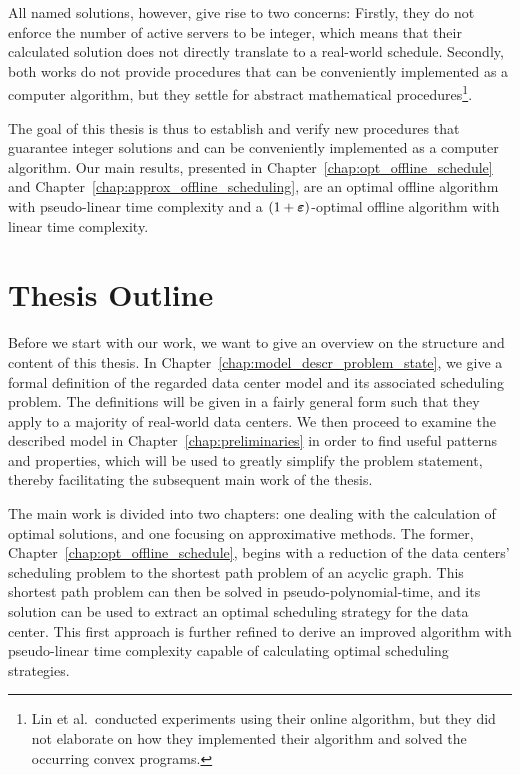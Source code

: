 All named solutions, however, give rise to two concerns: Firstly, they do not enforce the number of active servers to be integer, which means that their calculated solution does not directly translate to a real-world schedule. Secondly, both works do not provide procedures that can be conveniently implemented as a computer algorithm, but they settle for abstract mathematical procedures\footnote{Lin et al.\ conducted experiments using their online algorithm, but they did not elaborate on how they implemented their algorithm and solved the occurring convex programs.}.

The goal of this thesis is thus to establish and verify new procedures that guarantee integer solutions and can be conveniently implemented as a computer algorithm. Our main results, presented in Chapter~\ref{chap:opt_offline_schedule} and Chapter~\ref{chap:approx_offline_scheduling}, are an optimal offline algorithm with pseudo-linear time complexity and a $(1+\boldsymbol\varepsilon)$-optimal offline algorithm with linear time complexity.

\section{Thesis Outline}
Before we start with our work, we want to give an overview on the structure and content of this thesis. In Chapter~\ref{chap:model_descr_problem_state}, we give a formal definition of the regarded data center model and its associated scheduling problem. The definitions will be given in a fairly general form such that they apply to a majority of real-world data centers. We then proceed to examine the described model in Chapter~\ref{chap:preliminaries} in order to find useful patterns and properties, which will be used to greatly simplify the problem statement, thereby facilitating the subsequent main work of the thesis.

The main work is divided into two chapters: one dealing with the calculation of optimal solutions, and one focusing on approximative methods. The former, Chapter~\ref{chap:opt_offline_schedule}, begins with a reduction of the data centers' scheduling problem to the shortest path problem of an acyclic graph. This shortest path problem can then be solved in pseudo-polynomial-time, and its solution can be used to extract an optimal scheduling strategy for the data center. This first approach is further refined to derive an improved algorithm with pseudo-linear time complexity capable of calculating optimal scheduling strategies. 

